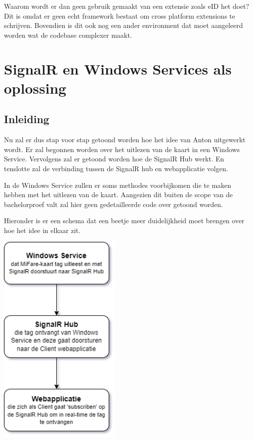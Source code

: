 Waarom wordt er dan geen gebruik gemaakt van een extensie zoals eID het doet? Dit is omdat er geen echt framework bestaat om cross platform extensions te schrijven. Bovendien is dit ook nog een ander environment dat moet aangeleerd worden wat de codebase complexer maakt.




\section{SignalR en Windows Services als oplossing}

\subsection{Inleiding}
Nu zal er dus stap voor stap getoond worden hoe het idee van Anton uitgewerkt wordt. Er zal begonnen worden over het uitlezen van de kaart in een Windows Service. Vervolgens zal er getoond worden hoe de SignalR Hub werkt. En tenslotte zal de verbinding tussen de SignalR hub en webapplicatie volgen.   

In de Windows Service zullen er soms methodes voorbijkomen die te maken hebben met het uitlezen van de kaart. Aangezien dit buiten de scope van de bachelorproef valt zal hier geen gedetailleerde code over getoond worden. 

Hieronder is er een schema dat een beetje meer duidelijkheid moet brengen over hoe het idee in elkaar zit. 

\begin{center}
    \includegraphics[width=6cm]{BP_voorbeeld_schema}
\end{center}

